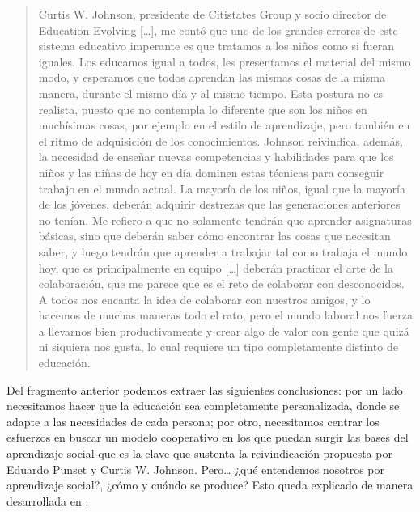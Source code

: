 \begin{quotation}
\small{Curtis W. Johnson, presidente de Citistates Group y socio director de Education Evolving [\ldots], me contó que uno de los grandes errores de este sistema educativo imperante es que \guillemotleft tratamos a los niños como si fueran iguales. Los educamos igual a todos, les presentamos el material del mismo modo, y esperamos que todos aprendan las mismas cosas de la misma manera, durante el mismo día y al mismo tiempo. Esta postura no es realista, puesto que no contempla lo diferente que son los niños en muchísimas cosas, por ejemplo en el estilo de aprendizaje, pero también en el ritmo de adquisición de los conocimientos.\guillemotright{} Johnson reivindica, además, la necesidad de enseñar nuevas competencias y habilidades para que los niños y las niñas de hoy en día dominen estas técnicas para conseguir trabajo en el mundo actual. \guillemotleft La mayoría de los niños, igual que la mayoría de los jóvenes, deberán adquirir destrezas que las generaciones anteriores no tenían. Me refiero a que no solamente tendrán que aprender asignaturas básicas, sino que deberán saber cómo encontrar las cosas que necesitan saber, y luego tendrán que aprender a trabajar tal como trabaja el mundo hoy, que es principalmente en equipo [\ldots] deberán practicar el arte de la colaboración, que me parece que es el reto de colaborar con desconocidos. A todos nos encanta la idea de colaborar con nuestros amigos, y lo hacemos de muchas maneras todo el rato, pero el mundo laboral nos fuerza a llevarnos bien productivamente y crear algo de valor con gente que quizá ni siquiera nos gusta, lo cual requiere un tipo completamente distinto de educación.\guillemotright{}}
\end{quotation}

Del fragmento anterior podemos extraer las siguientes conclusiones: por un lado necesitamos hacer que la educación sea completamente personalizada, donde se adapte a las necesidades de cada persona; por otro, necesitamos centrar los esfuerzos en buscar un modelo cooperativo en los que puedan surgir las bases del aprendizaje social que es la clave que sustenta la reivindicación propuesta por Eduardo Punset y Curtis W. Johnson. Pero\ldots{} ¿qué entendemos nosotros por aprendizaje social?, ¿cómo y cuándo se produce? Esto queda explicado de manera desarrollada en \cite[pág.~1]{paper:aprendizaje-social}:

